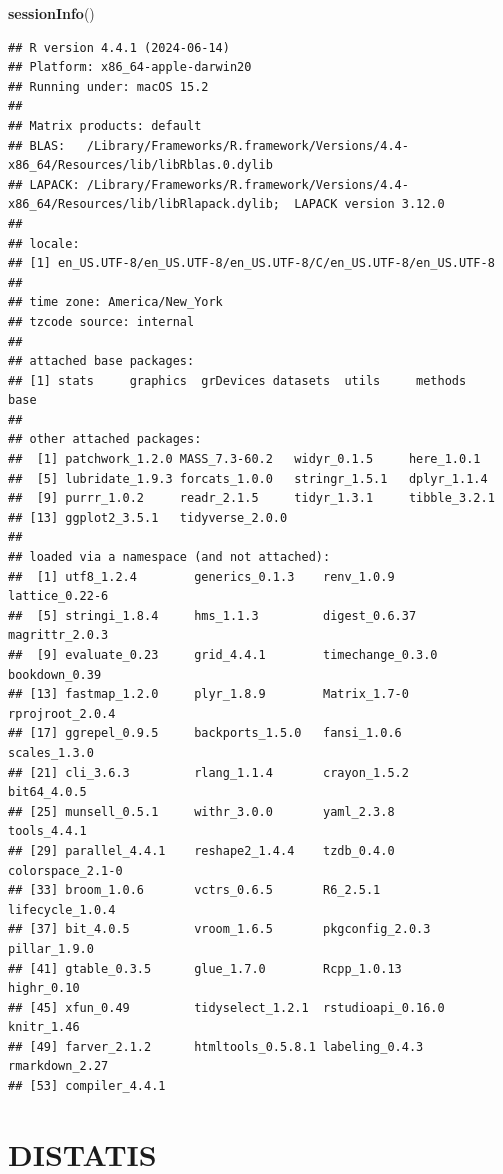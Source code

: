 \documentclass[
]{book}
\newenvironment{Shaded}{\begin{snugshade}}{\end{snugshade}}
\newcommand{\FunctionTok}[1]{\textcolor[rgb]{0.13,0.29,0.53}{\textbf{#1}}}
\newcommand{\NormalTok}[1]{#1}
\begin{document}
\begin{Shaded}
\begin{Highlighting}[]
\FunctionTok{sessionInfo}\NormalTok{()}
\end{Highlighting}
\end{Shaded}

\begin{verbatim}
## R version 4.4.1 (2024-06-14)
## Platform: x86_64-apple-darwin20
## Running under: macOS 15.2
## 
## Matrix products: default
## BLAS:   /Library/Frameworks/R.framework/Versions/4.4-x86_64/Resources/lib/libRblas.0.dylib 
## LAPACK: /Library/Frameworks/R.framework/Versions/4.4-x86_64/Resources/lib/libRlapack.dylib;  LAPACK version 3.12.0
## 
## locale:
## [1] en_US.UTF-8/en_US.UTF-8/en_US.UTF-8/C/en_US.UTF-8/en_US.UTF-8
## 
## time zone: America/New_York
## tzcode source: internal
## 
## attached base packages:
## [1] stats     graphics  grDevices datasets  utils     methods   base     
## 
## other attached packages:
##  [1] patchwork_1.2.0 MASS_7.3-60.2   widyr_0.1.5     here_1.0.1     
##  [5] lubridate_1.9.3 forcats_1.0.0   stringr_1.5.1   dplyr_1.1.4    
##  [9] purrr_1.0.2     readr_2.1.5     tidyr_1.3.1     tibble_3.2.1   
## [13] ggplot2_3.5.1   tidyverse_2.0.0
## 
## loaded via a namespace (and not attached):
##  [1] utf8_1.2.4        generics_0.1.3    renv_1.0.9        lattice_0.22-6   
##  [5] stringi_1.8.4     hms_1.1.3         digest_0.6.37     magrittr_2.0.3   
##  [9] evaluate_0.23     grid_4.4.1        timechange_0.3.0  bookdown_0.39    
## [13] fastmap_1.2.0     plyr_1.8.9        Matrix_1.7-0      rprojroot_2.0.4  
## [17] ggrepel_0.9.5     backports_1.5.0   fansi_1.0.6       scales_1.3.0     
## [21] cli_3.6.3         rlang_1.1.4       crayon_1.5.2      bit64_4.0.5      
## [25] munsell_0.5.1     withr_3.0.0       yaml_2.3.8        tools_4.4.1      
## [29] parallel_4.4.1    reshape2_1.4.4    tzdb_0.4.0        colorspace_2.1-0 
## [33] broom_1.0.6       vctrs_0.6.5       R6_2.5.1          lifecycle_1.0.4  
## [37] bit_4.0.5         vroom_1.6.5       pkgconfig_2.0.3   pillar_1.9.0     
## [41] gtable_0.3.5      glue_1.7.0        Rcpp_1.0.13       highr_0.10       
## [45] xfun_0.49         tidyselect_1.2.1  rstudioapi_0.16.0 knitr_1.46       
## [49] farver_2.1.2      htmltools_0.5.8.1 labeling_0.4.3    rmarkdown_2.27   
## [53] compiler_4.4.1
\end{verbatim}

\chapter{DISTATIS}\label{distatis}
\end{document}

